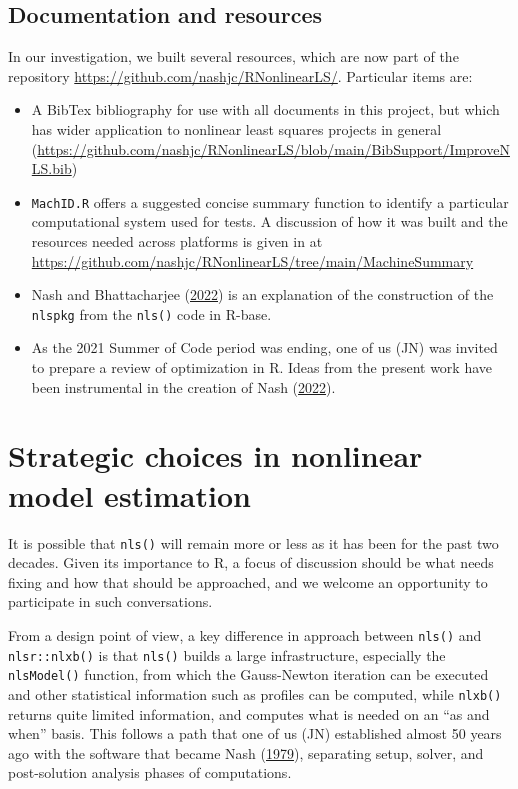 \documentclass[
]{article}
\begin{document}
\hypertarget{documentation-and-resources}{%
\subsection{Documentation and
resources}\label{documentation-and-resources}}

In our investigation, we built several resources, which are now part of
the repository \url{https://github.com/nashjc/RNonlinearLS/}. Particular
items are:

\begin{itemize}
\item
  A BibTex bibliography for use with all documents in this project, but
  which has wider application to nonlinear least squares projects in
  general
  (\url{https://github.com/nashjc/RNonlinearLS/blob/main/BibSupport/ImproveNLS.bib})
\item
  \texttt{MachID.R} offers a suggested concise summary function to
  identify a particular computational system used for tests. A
  discussion of how it was built and the resources needed across
  platforms is given in at
  \url{https://github.com/nashjc/RNonlinearLS/tree/main/MachineSummary}
\item
  Nash and Bhattacharjee (\protect\hyperlink{ref-PkgFromRbase22}{2022})
  is an explanation of the construction of the \texttt{nlspkg} from the
  \texttt{nls()} code in R-base.
\item
  As the 2021 Summer of Code period was ending, one of us (JN) was
  invited to prepare a review of optimization in R. Ideas from the
  present work have been instrumental in the creation of Nash
  (\protect\hyperlink{ref-NashWires22}{2022}).
\end{itemize}

\hypertarget{strategic-choices-in-nonlinear-model-estimation}{%
\section{Strategic choices in nonlinear model
estimation}\label{strategic-choices-in-nonlinear-model-estimation}}

It is possible that \texttt{nls()} will remain more or less as it has
been for the past two decades. Given its importance to R, a focus of
discussion should be what needs fixing and how that should be
approached, and we welcome an opportunity to participate in such
conversations.

From a design point of view, a key difference in approach between
\texttt{nls()} and \texttt{nlsr::nlxb()} is that \texttt{nls()} builds a
large infrastructure, especially the \texttt{nlsModel()} function, from
which the Gauss-Newton iteration can be executed and other statistical
information such as profiles can be computed, while \texttt{nlxb()}
returns quite limited information, and computes what is needed on an
``as and when'' basis. This follows a path that one of us (JN)
established almost 50 years ago with the software that became Nash
(\protect\hyperlink{ref-cnm79}{1979}), separating setup, solver, and
post-solution analysis phases of computations.
\end{document}
